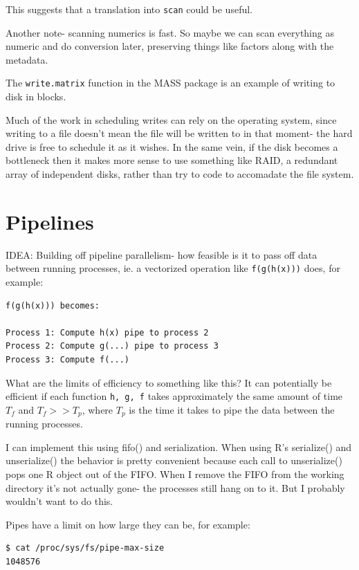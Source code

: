 \documentclass[12pt]{article}
\begin{document}
This suggests that a translation into \texttt{scan} could be useful.

Another note- scanning numerics is fast. So maybe we can scan everything as
numeric and do conversion later, preserving things like factors along with
the metadata.

The \texttt{write.matrix} function in the MASS package is an example of
writing to disk in blocks.

Much of the work in scheduling writes can rely on the operating system,
since writing to a file doesn't mean the file will be written to in that
moment- the hard drive is free to schedule it as it wishes. In the same
vein, if the disk becomes a bottleneck then it makes more sense to use
something like RAID, a redundant array of independent disks, rather than
try to code to accomadate the file system.

\section{Pipelines}

IDEA: Building off pipeline parallelism- how feasible is it to pass off
data between running processes, ie. a vectorized operation like
\texttt{f(g(h(x)))} does, for example:

\begin{verbatim}
f(g(h(x))) becomes:

Process 1: Compute h(x) pipe to process 2
Process 2: Compute g(...) pipe to process 3
Process 3: Compute f(...)
\end{verbatim}

What are the limits of efficiency to something like this? It can
potentially be
efficient if each function \texttt{h, g, f} takes approximately the same
amount of time $T_f$ and $T_f >> T_p$, where $T_p$ is the time it takes to
pipe the data between the running processes. 

I can implement this using fifo() and serialization. When using R's
serialize() and unserialize() the behavior is pretty convenient because
each call to unserialize() pops one R object out of the FIFO.
When I remove the FIFO from the working directory it's not actually gone-
the processes still hang on to it. But I probably wouldn't want to do this.

Pipes have a limit on how large they can be, for example:
\begin{verbatim}
$ cat /proc/sys/fs/pipe-max-size
1048576
\end{verbatim}
\end{document}

